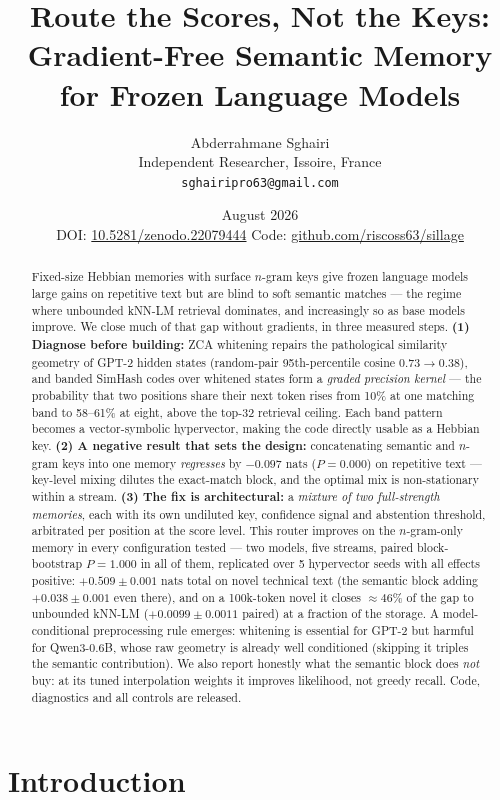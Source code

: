 \documentclass[11pt]{article}
\title{\bfseries Route the Scores, Not the Keys:\\
Gradient-Free Semantic Memory for Frozen Language Models}
\author{Abderrahmane Sghairi\\
\small Independent Researcher, Issoire, France\\
\small \texttt{sghairipro63@gmail.com}}
\date{August 2026\\[2pt]
\small DOI: \href{https://doi.org/10.5281/zenodo.22079444}{10.5281/zenodo.22079444}
\qquad Code: \href{https://github.com/riscoss63/sillage}{github.com/riscoss63/sillage}}
\begin{document}
\maketitle

\begin{abstract}
Fixed-size Hebbian memories with surface $n$-gram keys give frozen language models large gains on repetitive text but are blind to soft semantic matches --- the regime where unbounded kNN-LM retrieval dominates, and increasingly so as base models improve. We close much of that gap without gradients, in three measured steps. \textbf{(1) Diagnose before building:} ZCA whitening repairs the pathological similarity geometry of GPT-2 hidden states (random-pair 95th-percentile cosine $0.73 \to 0.38$), and banded SimHash codes over whitened states form a \emph{graded precision kernel} --- the probability that two positions share their next token rises from 10\% at one matching band to 58--61\% at eight, above the top-32 retrieval ceiling. Each band pattern becomes a vector-symbolic hypervector, making the code directly usable as a Hebbian key. \textbf{(2) A negative result that sets the design:} concatenating semantic and $n$-gram keys into one memory \emph{regresses} by $-0.097$ nats ($P{=}0.000$) on repetitive text --- key-level mixing dilutes the exact-match block, and the optimal mix is non-stationary within a stream. \textbf{(3) The fix is architectural:} a \emph{mixture of two full-strength memories}, each with its own undiluted key, confidence signal and abstention threshold, arbitrated per position at the score level. This router improves on the $n$-gram-only memory in every configuration tested --- two models, five streams, paired block-bootstrap $P = 1.000$ in all of them, replicated over 5 hypervector seeds with all effects positive: $+0.509 \pm 0.001$ nats total on novel technical text (the semantic block adding $+0.038 \pm 0.001$ even there), and on a 100k-token novel it closes $\approx 46\%$ of the gap to unbounded kNN-LM ($+0.0099 \pm 0.0011$ paired) at a fraction of the storage. A model-conditional preprocessing rule emerges: whitening is essential for GPT-2 but harmful for Qwen3-0.6B, whose raw geometry is already well conditioned (skipping it triples the semantic contribution). We also report honestly what the semantic block does \emph{not} buy: at its tuned interpolation weights it improves likelihood, not greedy recall. Code, diagnostics and all controls are released.
\end{abstract}

\section{Introduction}
\end{document}
